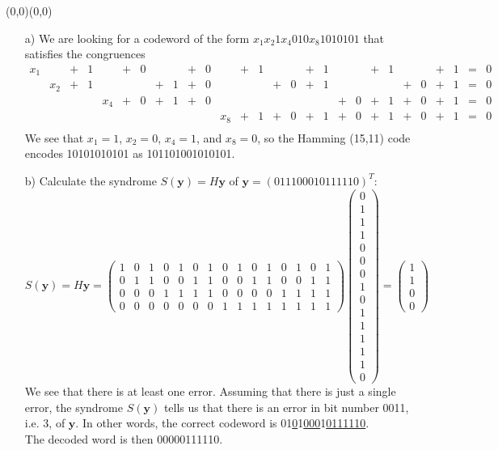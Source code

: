 \documentclass[11pt]{article}
\renewcommand{\vec}[1]{\mathbf{#1}}
\newcommand{\vc}[1]{\begin{pmatrix}#1\end{pmatrix}}
\newcommand{\moveup}{\begin{picture}(0,0)(0,0)\end{picture}\vspace*{-8.15mm}}
\begin{document}
\newpage
{}\moveup
\begin{itemize}
  \item[{a)}]
    We are looking for a codeword of the form $x_1 x_2 1 x_4 0 1 0 x_8 1 0 1 0 1 0 1$ that satisfies the congruences
    \[
      \begin{array}{cccccccccccccccccccccccccccc}
        x_1 &      &+& 1    &   &+& 0 & &   &+& 0 &    &+& 1 & &   &+& 1 & &   &+& 1 & &   &+& 1 &=& 0\\
            & x_2  &+& 1    &   & &   &+& 1 &+& 0 &    & &   &+& 0 &+& 1 & &   & &   &+& 0 &+& 1 &=& 0\\
            &      & &      &x_4&+& 0 &+& 1 &+& 0 &    & &   & &   & &   &+& 0 &+& 1 &+& 0 &+& 1 &=& 0\\
            &      & &      &   & &   & &   & &   &x_8 &+& 1 &+& 0 &+& 1 &+& 0 &+& 1 &+& 0 &+& 1 &=& 0\\
      \end{array}
    \]
    We see that $x_1 = 1$, $x_2 = 0$, $x_4 = 1$, and $x_8 = 0$,
    so the Hamming (15,11) code encodes 10101010101 as 101101001010101.
  \item[{b)}]
    Calculate the syndrome $S(\vec{y}) = H\vec{y}$ of $\vec{y} = (011100010111110)^T$:\vspace*{-10mm}
  \[
      S(\vec{y})
    = H\vec{y}
    = \left(\begin{array}{ccccccccccccccc}
        1&0&1&0&1&0&1&0&1&0&1&0&1&0&1\\
        0&1&1&0&0&1&1&0&0&1&1&0&0&1&1\\
        0&0&0&1&1&1&1&0&0&0&0&1&1&1&1\\
        0&0&0&0&0&0&0&1&1&1&1&1&1&1&1\end{array}\right)
      \vc{0\\[-1mm]1\\[-1mm]1\\[-1mm]1\\[-1mm]0\\[-1mm]0\\[-1mm]0\\[-1mm]1\\[-1mm]0\\[-1mm]1\\[-1mm]1\\[-1mm]1\\[-1mm]1\\[-1mm]1\\[-1mm]0}
    = \vc{1\\1\\0\\0}
  \]
  We see that there is at least one error.
  Assuming that there is just a single error, the syndrome $S(\vec{y})$ tells us that
  there is an error in bit number 0011, i.e. 3, of $\vec{y}$.
  In other words, the correct codeword is
  01\underline{0}1\underline{000}1\underline{0111110}.\\
  The decoded word is then 00000111110.
\end{itemize}
\end{document}
